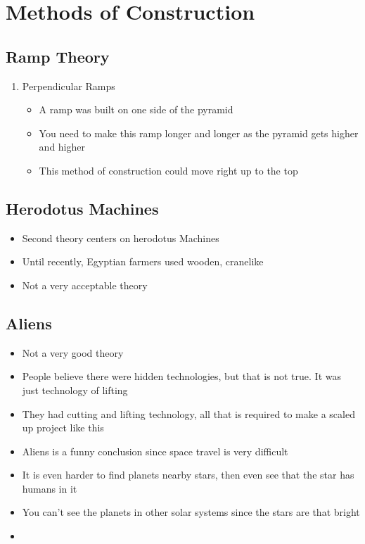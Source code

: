 \documentclass{article}
\begin{document}
\section{Methods of Construction}

\subsection{Ramp Theory}
\begin{enumerate}
  \item Perpendicular Ramps
    \begin{itemize}
      \item A ramp was built on one side of the pyramid
      \item You need to make this ramp longer and longer as
        the pyramid gets higher and higher
      \item This method of construction could move
        right up to the top
    \end{itemize}
\end{enumerate}

\subsection{Herodotus Machines}
\begin{itemize}
  \item Second theory centers on herodotus Machines
  \item Until recently, Egyptian farmers used wooden, cranelike
  \item Not a very acceptable theory
\end{itemize}

\subsection{Aliens}
\begin{itemize}
  \item Not a very good theory
  \item People believe there were hidden technologies,
    but that is not true.
    It was just technology of lifting
  \item They had cutting and lifting technology,
    all that is required to make a scaled up project like this
  \item Aliens is a funny conclusion since
    space travel is very difficult
  \item It is even harder to find planets nearby stars, then even
    see that the star has humans in it
  \item You can't see the planets in other solar systems
    since the stars are that bright
  \item

\end{itemize}
\end{document}
